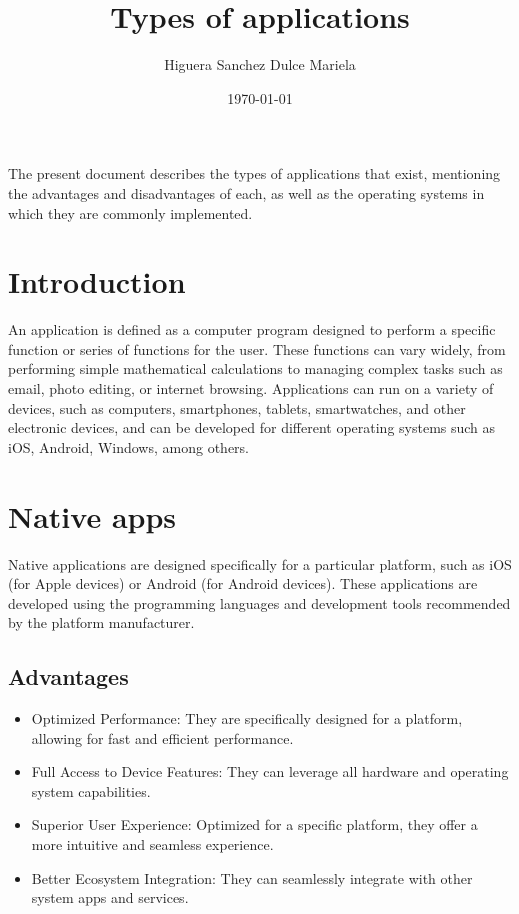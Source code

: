 \documentclass{article}
\title{Types of applications}
\author{Higuera Sanchez Dulce Mariela}
\date{\today}
\begin{document}
 
	
	\maketitle The present document describes the types of applications that exist, mentioning the advantages and disadvantages of each, as well as the operating systems in which they are commonly implemented.
	
	\begin{multicols}{2}
		
		\section{Introduction}
		An application is defined as a computer program designed to perform a specific function or series of functions for the user. These functions can vary widely, from performing simple mathematical calculations to managing complex tasks such as email, photo editing, or internet browsing. Applications can run on a variety of devices, such as computers, smartphones, tablets, smartwatches, and other electronic devices, and can be developed for different operating systems such as iOS, Android, Windows, among others.
		
		\section{Native apps}
		Native applications are designed specifically for a particular platform, such as iOS (for Apple devices) or Android (for Android devices). These applications are developed using the programming languages and development tools recommended by the platform manufacturer.
		
		\subsection{Advantages}
		
		\begin{itemize}
			\item Optimized Performance: They are specifically designed for a platform, allowing for fast and efficient performance.
			\item Full Access to Device Features: They can leverage all hardware and operating system capabilities.
			\item Superior User Experience: Optimized for a specific platform, they offer a more intuitive and seamless experience.
			\item Better Ecosystem Integration: They can seamlessly integrate with other system apps and services.
		\end{itemize}
		

\end{multicols}
\end{document}
